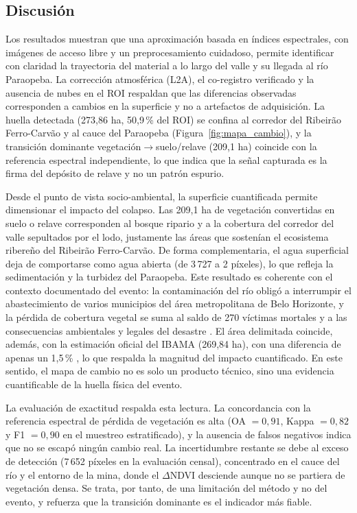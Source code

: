 \documentclass[12pt]{article}
\begin{document}
\subsection{Discusión}
Los resultados muestran que una aproximación basada en índices espectrales, con imágenes de acceso libre y un preprocesamiento cuidadoso, permite identificar con claridad la trayectoria del material a lo largo del valle y su llegada al río Paraopeba. La corrección atmosférica (L2A), el co-registro verificado y la ausencia de nubes en el ROI respaldan que las diferencias observadas corresponden a cambios en la superficie y no a artefactos de adquisición. La huella detectada (273{,}86 ha, 50{,}9\,\% del ROI) se confina al corredor del Ribeirão Ferro-Carvão y al cauce del Paraopeba (Figura~\ref{fig:mapa_cambio}), y la transición dominante vegetación$\rightarrow$suelo/relave (209{,}1 ha) coincide con la referencia espectral independiente, lo que indica que la señal capturada es la firma del depósito de relave y no un patrón espurio.

Desde el punto de vista socio-ambiental, la superficie cuantificada permite dimensionar el impacto del colapso. Las 209{,}1 ha de vegetación convertidas en suelo o relave corresponden al bosque ripario y a la cobertura del corredor del valle sepultados por el lodo, justamente las áreas que sostenían el ecosistema ribereño del Ribeirão Ferro-Carvão. De forma complementaria, el agua superficial deja de comportarse como agua abierta (de 3\,727 a 2 píxeles), lo que refleja la sedimentación y la turbidez del Paraopeba. Este resultado es coherente con el contexto documentado del evento: la contaminación del río obligó a interrumpir el abastecimiento de varios municipios del área metropolitana de Belo Horizonte, y la pérdida de cobertura vegetal se suma al saldo de 270 víctimas mortales y a las consecuencias ambientales y legales del desastre \parencite{Rotta2020}. El área delimitada coincide, además, con la estimación oficial del IBAMA (269{,}84 ha), con una diferencia de apenas un 1{,}5\,\% \parencite{IBAMA2019}, lo que respalda la magnitud del impacto cuantificado. En este sentido, el mapa de cambio no es solo un producto técnico, sino una evidencia cuantificable de la huella física del evento.

La evaluación de exactitud respalda esta lectura. La concordancia con la referencia espectral de pérdida de vegetación es alta (OA $=0{,}91$, Kappa $=0{,}82$ y F1 $=0{,}90$ en el muestreo estratificado), y la ausencia de falsos negativos indica que no se escapó ningún cambio real. La incertidumbre restante se debe al exceso de detección (7\,652 píxeles en la evaluación censal), concentrado en el cauce del río y el entorno de la mina, donde el $\Delta$NDVI desciende aunque no se partiera de vegetación densa. Se trata, por tanto, de una limitación del método y no del evento, y refuerza que la transición dominante es el indicador más fiable.
\end{document}
